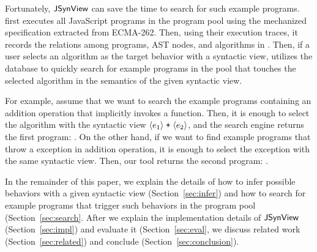 Fortunately, $\tool$ can save the time to search for such example programs.
 first executes all JavaScript programs in the program
pool using the mechanized specification extracted from ECMA-262.  Then, using
their execution traces, it records the relations among programs, AST nodes, and
algorithms in .  Then, if a user selects an algorithm as
the target behavior with a syntactic view,  utilizes
the database to quickly search for example programs in the pool that touches the
selected algorithm in the semantics of the given syntactic view.

For example, assume that we want to search the example programs containing an
addition operation that implicitly invokes a function.  Then, it is enough to
select the  algorithm with the syntactic view $\svhole{\expr_1} \;
\code{+} \; \svhole{\expr_2}$, and the search engine returns the first program:
.  On the other hand, if we want to find
example programs that throw a  exception in addition
operation, it is enough to select the exception with the same syntactic view.
Then, our tool returns the second program: .

In the remainder of this paper, we explain the details of how to infer possible
behaviors with a given syntactic view (Section~\ref{sec:infer}) and how to
search for example programs that trigger such behaviors in the program pool
(Section~\ref{sec:search}.  After we explain the implementation details of
$\tool$ (Section~\ref{sec:impl}) and evaluate it (Section~\ref{sec:eval}, we
discuss related work (Section~\ref{sec:related}) and conclude
(Section~\ref{sec:conclusion}).
